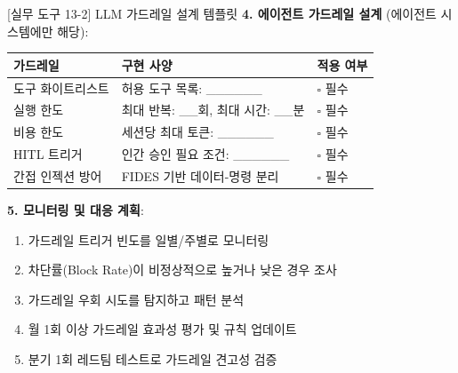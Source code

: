 \begin{practicaltool}{[실무 도구 13-2] LLM 가드레일 설계 템플릿}
\textbf{4. 에이전트 가드레일 설계} (에이전트 시스템에만 해당):

\begin{tabularx}{\textwidth}{|p{3cm}|X|p{2cm}|}
\hline
\textbf{가드레일} & \textbf{구현 사양} & \textbf{적용 여부} \\
\hline
도구 화이트리스트 & 허용 도구 목록: \_\_\_\_\_\_ & $\square$ 필수 \\
\hline
실행 한도 & 최대 반복: \_\_회, 최대 시간: \_\_분 & $\square$ 필수 \\
\hline
비용 한도 & 세션당 최대 토큰: \_\_\_\_\_\_ & $\square$ 필수 \\
\hline
HITL 트리거 & 인간 승인 필요 조건: \_\_\_\_\_\_ & $\square$ 필수 \\
\hline
간접 인젝션 방어 & FIDES 기반 데이터-명령 분리 & $\square$ 필수 \\
\hline
\end{tabularx}

\textbf{5. 모니터링 및 대응 계획}:
\begin{enumerate}
 \item 가드레일 트리거 빈도를 일별/주별로 모니터링
 \item 차단률(Block Rate)이 비정상적으로 높거나 낮은 경우 조사
 \item 가드레일 우회 시도를 탐지하고 패턴 분석
 \item 월 1회 이상 가드레일 효과성 평가 및 규칙 업데이트
 \item 분기 1회 레드팀 테스트로 가드레일 견고성 검증
\end{enumerate}
\end{practicaltool}


